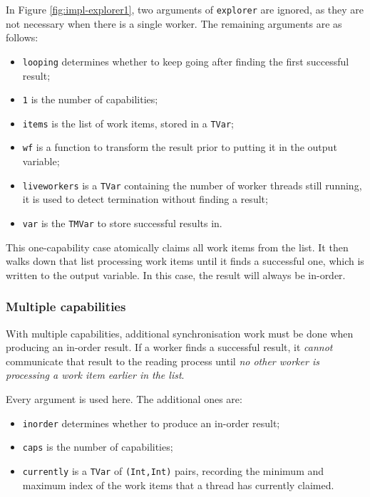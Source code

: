 In Figure \ref{fig:impl-explorer1}, two arguments of \verb|explorer|
are ignored, as they are not necessary when there is a single
worker. The remaining arguments are as follows:

\begin{itemize}
  \item \verb|looping| determines whether to keep going after finding
    the first successful result;

  \item \verb|1| is the number of capabilities;

  \item \verb|items| is the list of work items, stored in a
    \verb|TVar|;

  \item \verb|wf| is a function to transform the result prior to
    putting it in the output variable;

  \item \verb|liveworkers| is a \verb|TVar| containing the number of
    worker threads still running, it is used to detect termination
    without finding a result;

  \item \verb|var| is the \verb|TMVar| to store successful results
    in.
\end{itemize}

This one-capability case atomically claims all work items from the
list. It then walks down that list processing work items until it
finds a successful one, which is written to the output variable. In
this case, the result will always be in-order.

\subsubsection{Multiple capabilities}
\label{sec:prelims-searchparty-impl-multi}

With multiple capabilities, additional synchronisation work must be
done when producing an in-order result. If a worker finds a successful
result, it \textit{cannot} communicate that result to the reading
process until \textit{no other worker is processing a work item
  earlier in the list}.

Every argument is used here. The additional ones are:

\begin{itemize}
  \item \verb|inorder| determines whether to produce an in-order
    result;

  \item \verb|caps| is the number of capabilities;

  \item \verb|currently| is a \verb|TVar| of \verb|(Int,Int)| pairs,
    recording the minimum and maximum index of the work items that a
    thread has currently claimed.
\end{itemize}

